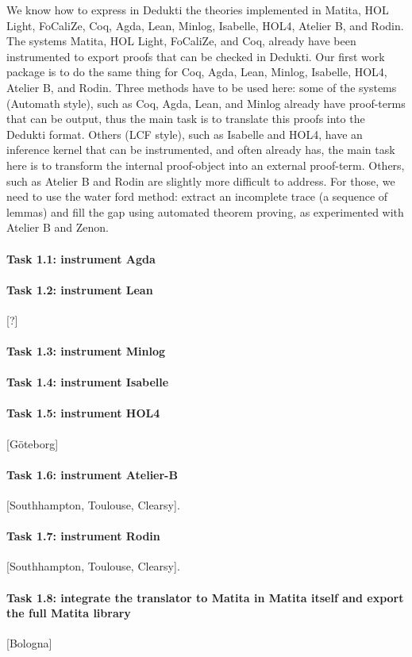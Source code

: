 We know how to express in Dedukti the theories implemented in Matita,
HOL Light, FoCaliZe, Coq, Agda, Lean, Minlog, Isabelle, HOL4,
Atelier B, and Rodin. The systems Matita, HOL Light, FoCaliZe, and
Coq, already have been instrumented to export proofs that can be
checked in Dedukti. Our first work package is to do the same thing for
Coq, Agda, Lean, Minlog, Isabelle, HOL4, Atelier B, and
Rodin. Three methods have to be used here: some of the systems
(Automath style), such as Coq, Agda, Lean, and Minlog already have
proof-terms that can be output, thus the main task is to translate
this proofs into the Dedukti format. Others (LCF style), such as
Isabelle and HOL4, have an inference kernel that can be
instrumented, and often already has, the main task here is to transform
the internal proof-object into an external proof-term. Others, such as
Atelier B and Rodin are slightly more difficult to address. For those,
we need to use the water ford method: extract an incomplete trace (a
sequence of lemmas) and fill the gap using automated theorem proving,
as experimented with Atelier B and Zenon.


\paragraph{Task 1.1: instrument Agda}



\paragraph{Task 1.2: instrument Lean}

[?]

\paragraph{Task 1.3: instrument Minlog}



\paragraph{Task 1.4: instrument Isabelle}



\paragraph{Task 1.5: instrument HOL4}

[G\"oteborg]

\paragraph{Task 1.6: instrument Atelier-B}

[Southhampton, Toulouse, Clearsy].

\paragraph{Task 1.7: instrument Rodin}

[Southhampton, Toulouse, Clearsy].

\paragraph{Task 1.8: integrate the translator to Matita in Matita itself and export the full Matita library}

[Bologna]

